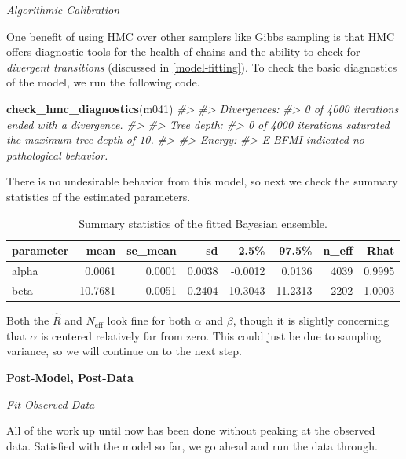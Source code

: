 \documentclass[11pt, oneside, openany]{scrbook}
\newenvironment{Shaded}{\begin{snugshade}}{\end{snugshade}}
\newcommand{\CommentTok}[1]{\textcolor[rgb]{0.56,0.35,0.01}{\textit{#1}}}
\newcommand{\KeywordTok}[1]{\textcolor[rgb]{0.13,0.29,0.53}{\textbf{#1}}}
\newcommand{\NormalTok}[1]{#1}
\begin{document}
\emph{Algorithmic Calibration}

One benefit of using HMC over other samplers like Gibbs sampling is that HMC offers diagnostic tools for the health of chains and the ability to check for \emph{divergent transitions} (discussed in \ref{model-fitting}). To check the basic diagnostics of the model, we run the following code.

\begin{Shaded}
\begin{Highlighting}[]
\KeywordTok{check_hmc_diagnostics}\NormalTok{(m041)}
\CommentTok{#> }
\CommentTok{#> Divergences:}
\CommentTok{#> 0 of 4000 iterations ended with a divergence.}
\CommentTok{#> }
\CommentTok{#> Tree depth:}
\CommentTok{#> 0 of 4000 iterations saturated the maximum tree depth of 10.}
\CommentTok{#> }
\CommentTok{#> Energy:}
\CommentTok{#> E-BFMI indicated no pathological behavior.}
\end{Highlighting}
\end{Shaded}

There is no undesirable behavior from this model, so next we check the summary statistics of the estimated parameters.

\begin{table}[!h]

\caption{\label{tab:ch041-Cloudy-Toupee}Summary statistics of the fitted Bayesian ensemble.}
\centering
\begin{tabular}[t]{lrrrrrrr}
\toprule
parameter & mean & se\_mean & sd & 2.5\% & 97.5\% & n\_eff & Rhat\\
\midrule
alpha & 0.0061 & 0.0001 & 0.0038 & -0.0012 & 0.0136 & 4039 & 0.9995\\
beta & 10.7681 & 0.0051 & 0.2404 & 10.3043 & 11.2313 & 2202 & 1.0003\\
\bottomrule
\end{tabular}
\end{table}

Both the \(\hat{R}\) and \(N_{\mathrm{eff}}\) look fine for both \(\alpha\) and \(\beta\), though it is slightly concerning that \(\alpha\) is centered relatively far from zero. This could just be due to sampling variance, so we will continue on to the next step.

\textbf{Post-Model, Post-Data}

\emph{Fit Observed Data}

All of the work up until now has been done without peaking at the observed data. Satisfied with the model so far, we go ahead and run the data through.
\end{document}
